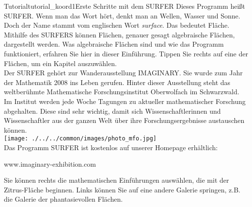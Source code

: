 \begin{surferIntroPage}{Tutorial}{tutorial_koord1}{Erste Schritte mit dem SURFER}
Dieses Programm heißt SURFER. Wenn man das Wort hört, denkt man an Wellen, Wasser und Sonne. Doch der Name stammt vom englischen Wort {\it surface}. Das bedeutet Fläche.\\
Mithilfe des SURFERS können Flächen, genauer gesagt algebraische Flächen, dargestellt werden. Was algebraische Flächen sind und wie das Programm funktioniert, erfahren Sie hier in dieser Einführung. Tippen Sie rechts auf eine der Flächen, um ein Kapitel auszuwählen. \\
Der SURFER gehört zur Wanderausstellung IMAGINARY. Sie wurde zum Jahr der Mathematik 2008 ins Leben gerufen. Hinter dieser Ausstellung steht das weltberühmte Mathematische Forschungsinstitut Oberwolfach im Schwarzwald. Im Institut werden jede Woche Tagungen zu aktueller mathematischer Forschung abgehalten. Diese sind sehr wichtig, damit sich Wissenschaftlerinnen und Wissenschaftler aus der ganzen Welt über ihre Forschungsergebnisse austauschen können. \\
\vspace{0.2cm} \hspace{3.5cm}\texttt{[image: ./../../common/images/photo\_mfo.jpg]}\\
Das Programm SURFER ist kostenlos auf unserer Homepage erhältlich: \\
\begin{centering}
www.imaginary-exhibition.com\\
\end{centering}
 \vspace{0.2cm}
Sie können rechts die mathematischen Einführungen auswählen, die mit der Zitrus-Fläche beginnen. Links können Sie auf eine andere Galerie springen, z.B. die Galerie der phantasievollen Flächen.
\end{surferIntroPage}